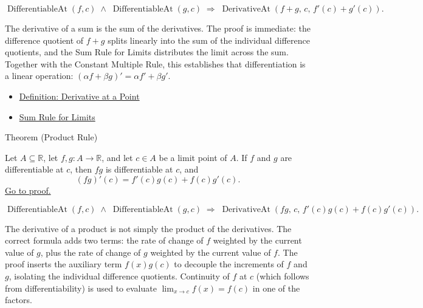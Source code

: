 \begin{remark*}
\[
\operatorname{DifferentiableAt}(f,c) \;\land\; \operatorname{DifferentiableAt}(g,c)
\;\Rightarrow\;
\operatorname{DerivativeAt}(f+g,\,c,\,f'(c)+g'(c)).
\]
\end{remark*}

\begin{remark*}[Interpretation]
The derivative of a sum is the sum of the derivatives. The proof is immediate: the difference quotient of $f+g$ splits linearly into the sum of the individual difference quotients, and the Sum Rule for Limits distributes the limit across the sum. Together with the Constant Multiple Rule, this establishes that differentiation is a linear operation: $(\alpha f + \beta g)' = \alpha f' + \beta g'$.
\end{remark*}

\begin{dependencies}
\begin{itemize}
  \item \hyperref[def:derivative-at-a-point]{Definition: Derivative at a Point}
  \item \hyperref[thm:limit-sum]{Sum Rule for Limits}
\end{itemize}
\end{dependencies}


\begin{theorembox}{Theorem (Product Rule)}
\begin{theorem}
\label{thm:product-rule}
Let $A \subseteq \mathbb{R}$, let $f, g : A \to \mathbb{R}$, and let $c \in A$ be a limit point of $A$. If $f$ and $g$ are differentiable at $c$, then $fg$ is differentiable at $c$, and
\[
(fg)'(c) = f'(c)g(c) + f(c)g'(c).
\]
\hyperref[prf:product-rule]{Go to proof.}
\end{theorem}
\end{theorembox}

\begin{remark*}
\[
\operatorname{DifferentiableAt}(f,c) \;\land\; \operatorname{DifferentiableAt}(g,c)
\;\Rightarrow\;
\operatorname{DerivativeAt}(fg,\,c,\,f'(c)g(c)+f(c)g'(c)).
\]
\end{remark*}

\begin{remark*}[Interpretation]
The derivative of a product is not simply the product of the derivatives. The correct formula adds two terms: the rate of change of $f$ weighted by the current value of $g$, plus the rate of change of $g$ weighted by the current value of $f$. The proof inserts the auxiliary term $f(x)g(c)$ to decouple the increments of $f$ and $g$, isolating the individual difference quotients. Continuity of $f$ at $c$ (which follows from differentiability) is used to evaluate $\lim_{x\to c} f(x) = f(c)$ in one of the factors.
\end{remark*}


